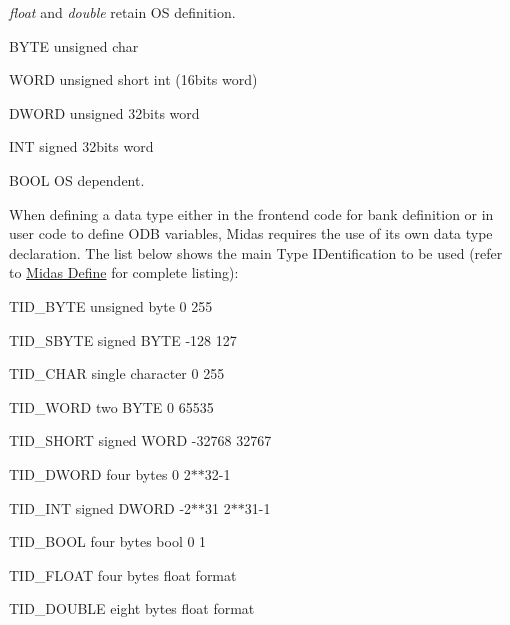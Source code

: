 {\itshape float\/} and {\itshape double\/} retain OS definition.


\begin{DoxyItemize}
\item BYTE unsigned char
\item WORD unsigned short int (16bits word)
\item DWORD unsigned 32bits word
\item INT signed 32bits word
\item BOOL OS dependent.
\end{DoxyItemize}

When defining a data type either in the frontend code for bank definition or in user code to define ODB variables, Midas requires the use of its own data type declaration. The list below shows the main Type IDentification to be used (refer to \hyperlink{group__mdefineh}{Midas Define} for complete listing):


\begin{DoxyItemize}
\item TID\_\-BYTE unsigned byte 0 255
\item TID\_\-SBYTE signed BYTE -\/128 127
\item TID\_\-CHAR single character 0 255
\item TID\_\-WORD two BYTE 0 65535
\item TID\_\-SHORT signed WORD -\/32768 32767
\item TID\_\-DWORD four bytes 0 2$\ast$$\ast$32-\/1
\item TID\_\-INT signed DWORD -\/2$\ast$$\ast$31 2$\ast$$\ast$31-\/1
\item TID\_\-BOOL four bytes bool 0 1
\item TID\_\-FLOAT four bytes float format
\item TID\_\-DOUBLE eight bytes float format
\end{DoxyItemize}



